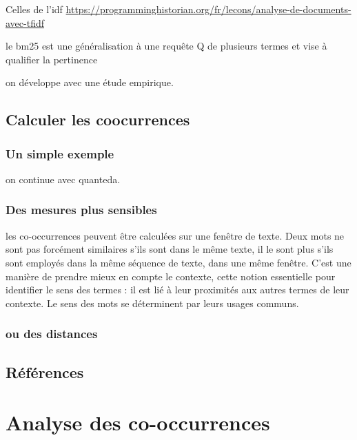 \documentclass[
  letterpaper,
  DIV=11,
  numbers=noendperiod]{scrreprt}
\begin{document}
Celles de l'idf
\url{https://programminghistorian.org/fr/lecons/analyse-de-documents-avec-tfidf}

le bm25 est une généralisation à une requête Q de plusieurs termes et
vise à qualifier la pertinence

on développe avec une étude empirique.

\section{Calculer les coocurrences}\label{calculer-les-coocurrences}

\subsection{Un simple exemple}\label{un-simple-exemple}

on continue avec quanteda.

\subsection{Des mesures plus
sensibles}\label{des-mesures-plus-sensibles}

les co-occurrences peuvent être calculées sur une fenêtre de texte. Deux
mots ne sont pas forcément similaires s'ils sont dans le même texte, il
le sont plus s'ils sont employés dans la même séquence de texte, dans
une même fenêtre. C'est une manière de prendre mieux en compte le
contexte, cette notion essentielle pour identifier le sens des termes :
il est lié à leur proximités aux autres termes de leur contexte. Le sens
des mots se déterminent par leurs usages communs.

\subsection{ou des distances}\label{ou-des-distances}

\section{Références}\label{ruxe9fuxe9rences-1}


\chapter{Analyse des co-occurrences}\label{analyse-des-co-occurrences}
\end{document}
